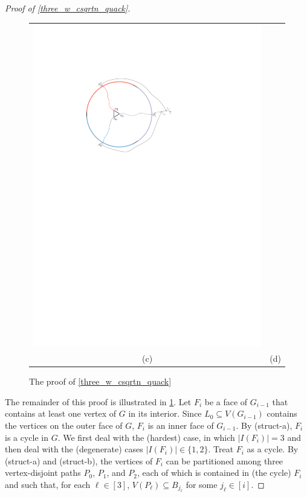 \documentclass{patmorin}
\begin{document}
\begin{proof}[Proof of \cref{three_w_csqrtn_quack}]
\begin{figure}
\begin{tabular}{cc}
      \includegraphics[page=4]{figs/second_case} \\
      (c) & (d) \\
    \end{tabular}
    \caption{The proof of \cref{three_w_csqrtn_quack}}
    \label{second_case_fig}
  \end{figure}

  The remainder of this proof is illustrated in \cref{second_case_fig}. Let $F_i$ be a face of $G_{i-1}$ that contains at least one vertex of $G$ in its interior.  Since $L_0\subseteq V(G_{i-1})$ contains the vertices on the outer face of $G$, $F_i$ is an inner face of $G_{i-1}$.  By (struct-a), $F_i$ is a cycle in $G$.  We first deal with the (hardest) case, in which $|I(F_i)|=3$ and then deal with the (degenerate) cases $|I(F_i)|\in\{1,2\}$.  Treat $F_i$ as a cycle.  By (struct-a) and (struct-b), the vertices of $F_i$ can be partitioned among three vertex-disjoint paths $P_0$, $P_1$, and $P_2$, each of which is contained in (the cycle) $F_i$ and such that, for each $\ell\in[3]$,  $V(P_\ell)\subseteq B_{j_\ell}$ for some $j_\ell\in[i]$.


\end{proof}
\end{document}
